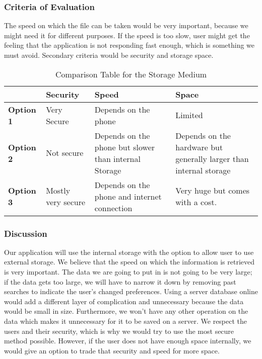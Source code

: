 \documentclass[journal,compsoc, 10pt, draftclsnofoot, onecolumn]{IEEEtran}
\begin{document}
\subsubsection{Criteria of Evaluation}
The speed on which the file can be taken would be very important, because we might need it for different purposes. If the speed is too slow, user might get the feeling that the application is not responding fast enough, which is something we must avoid. Secondary criteria would be security and storage space.

\begin{table}[h]
	\centering
	\caption{Comparison Table for the Storage Medium}
	\label{Comparison Table for the Storage Medium}
	\begin{tabularx}{\textwidth}{|X|X|X|X|}
		\hline
		\textbf{}         & \textbf{Security}                & \textbf{Speed} &\textbf{Space}
		\\ \hline
		\textbf{Option 1} & Very Secure & Depends on the phone & Limited
		\\ \hline
		\textbf{Option 2} & Not secure & Depends on the phone but slower than internal Storage & Depends on the hardware but generally larger than internal storage                                                                                         
		\\ \hline
		\textbf{Option 3} & Mostly very secure &Depends on the phone and internet connection & Very huge but comes with a cost.                                                               
		\\ \hline
	\end{tabularx}
\end{table}

\subsubsection{Discussion}
Our application will use the internal storage with the option to allow user to use external storage. We believe that the speed on which the information is retrieved is very important. The data we are going to put in is not going to be very large; if the data gets too large, we will have to narrow it down by removing past searches to indicate the user’s changed preferences. Using a server database online would add a different layer of complication and unnecessary because the data would be small in size. Furthermore, we won’t have any other operation on the data which makes it unnecessary for it to be saved on a server. We respect the users and their security, which is why we would try to use the most secure method possible. However, if the user does not have enough space internally, we would give an option to trade that security and speed for more space.
\end{document}
